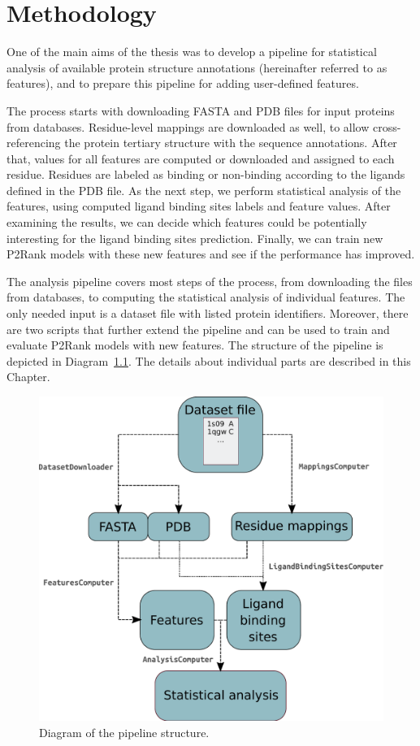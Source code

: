 \chapter{Methodology} \label{ch:3}

One of the main aims of the thesis was to develop a pipeline for statistical analysis of available protein structure annotations (hereinafter referred to as features), and to prepare this pipeline for adding user-defined features.

The process starts with downloading FASTA and PDB files for input proteins from databases. Residue-level mappings are downloaded as well, to allow cross-referencing the protein tertiary structure with the sequence annotations. After that, values for all features are computed or downloaded and assigned to each residue. Residues are labeled as binding or non-binding according to the ligands defined in the PDB file. As the next step, we perform statistical analysis of the features, using computed ligand binding sites labels and feature values. After examining the results, we can decide which features could be potentially interesting for the ligand binding sites prediction. Finally, we can train new P2Rank models with these new features and see if the performance has improved.


The analysis pipeline covers most steps of the process, from downloading the files from databases, to computing the statistical analysis of individual features. The only needed input is a dataset file with listed protein identifiers. Moreover, there are two scripts that further extend the pipeline and can be used to train and evaluate P2Rank models with new features. The structure of the pipeline is depicted in Diagram~\ref{fig:diagram}. The details about individual parts are described in this Chapter.


\begin{figure}[!h]\centering
\includegraphics[width=140mm]{../img/pipelineDiagram.pdf}
\caption{Diagram of the pipeline structure.}
\label{fig:diagram}
\end{figure}

